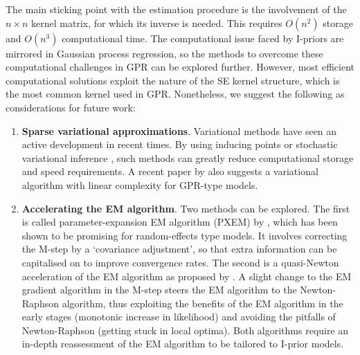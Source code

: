\documentclass[showframe,11pt]{report}
\begin{document}
The main sticking point with the estimation procedure is the involvement of the $n\times n$ kernel matrix, for which its inverse is needed.
This requires $O(n^2)$ storage and $O(n^3)$ computational time.
The computational issue faced by I-priors are mirrored in Gaussian process regression, so the methods to overcome these computational challenges in GPR can be explored further.
However, most efficient computational solutions exploit the nature of the SE kernel structure, which is the most common kernel used in GPR.
Nonetheless, we suggest the following as considerations for future work:
\begin{enumerate}
  \item \textbf{Sparse variational approximations}. Variational methods have seen an active development in recent times. By using inducing points \citep{titsias2009variational} or stochastic variational inference \citep{hensman2013gaussian}, such methods can greatly reduce computational storage and speed requirements. A recent paper by \citet{cheng2017variational} also suggests a variational algorithm with linear complexity for GPR-type models.
  \item \textbf{Accelerating the EM algorithm}. Two methods can be explored. The first is called parameter-expansion EM algorithm (PXEM) by \citet{liu1998parameter}, which has been shown to be promising for random-effects type models. It involves correcting the M-step by a `covariance adjustment', so that extra information can be capitalised on to improve convergence rates. The second is a quasi-Newton acceleration of the EM algorithm as proposed by \citet{lange1995quasi}. A slight change to the EM gradient algorithm in the M-step steers the EM algorithm to the Newton-Raphson algorithm, thus exploiting the benefits of the EM algorithm in the early stages (monotonic increase in likelihood) and avoiding the pitfalls of Newton-Raphson (getting stuck in local optima). Both algorithms require an in-depth reassessment of the EM algorithm to be tailored to I-prior models.
\end{enumerate}

\end{document}

